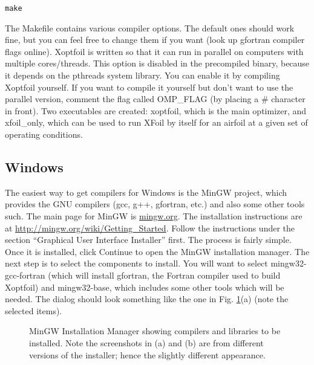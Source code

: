\documentclass[11pt]{article}
\begin{document}
\begin{verbatim}
make
\end{verbatim}

The Makefile contains various compiler options.  The default ones should work fine, but
you can feel free to change them if you want (look up gfortran compiler flags online).
Xoptfoil is written so that it can run in parallel on computers with multiple
cores/threads.  This option is disabled in the precompiled binary, because it depends on
the pthreads system library.  You can enable it by compiling Xoptfoil yourself.  If you
want to compile it yourself but don't want to use the parallel version, comment the flag
called OMP\_FLAG (by placing a \# character in front). Two executables are
created: xoptfoil, which is the main optimizer, and xfoil\_only, which can be used to run 
XFoil by itself for an airfoil at a given set of operating conditions.

\subsection{Windows}\label{sec:compile_windows}

The easiest way to get compilers for Windows is the MinGW project, which provides the GNU
compilers (gcc, g++, gfortran, etc.) and also some other tools such.  The main page for
MinGW is \url{mingw.org}.  The installation instructions are at
\url{http://mingw.org/wiki/Getting_Started}.  Follow the instructions under the section
``Graphical User Interface Installer'' first.  The process is fairly simple.  Once it is
installed, click Continue to open the MinGW installation manager.  The next step is to
select the components to install.  You will want to select mingw32-gcc-fortran 
(which will install gfortran, the Fortran
compiler used to build Xoptfoil) and mingw32-base, which includes some other tools
which will be needed.  The dialog should look something like the one in Fig.
\ref{fig:installmingw1}(a) (note the selected items).

\begin{figure}[!h]
\centering

   \caption{MinGW Installation Manager showing compilers and libraries to be installed.
Note the screenshots in (a) and (b) are from different versions of the installer; hence
the slightly different appearance.}
\label{fig:installmingw1}
\end{figure}
\end{document}
